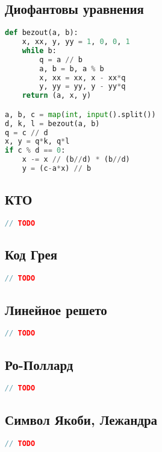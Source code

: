 \documentclass[10pt,a4paper,landscape,twosided]{extarticle}
\begin{document}
\begin{multicols}{3}
\begin{lstlisting}[language=C++]
\end{lstlisting}

\subsection{Диофантовы уравнения}
\begin{lstlisting}[language=Python]
def bezout(a, b):
    x, xx, y, yy = 1, 0, 0, 1
    while b:
        q = a // b
        a, b = b, a % b
        x, xx = xx, x - xx*q
        y, yy = yy, y - yy*q
    return (a, x, y)

a, b, c = map(int, input().split())
d, k, l = bezout(a, b)
q = c // d
x, y = q*k, q*l
if c % d == 0:
    x -= x // (b//d) * (b//d)
    y = (c-a*x) // b

\end{lstlisting}

\subsection{КТО}
\begin{lstlisting}[language=C++]
// TODO

\end{lstlisting}

\subsection{Код Грея}
\begin{lstlisting}[language=C++]
// TODO

\end{lstlisting}

\subsection{Линейное решето}
\begin{lstlisting}[language=C++]
// TODO

\end{lstlisting}

\subsection{Ро-Поллард}
\begin{lstlisting}[language=C++]
// TODO

\end{lstlisting}

\subsection{Символ Якоби, Лежандра}
\begin{lstlisting}[language=C++]
// TODO


\end{lstlisting}
\end{multicols}
\end{document}
